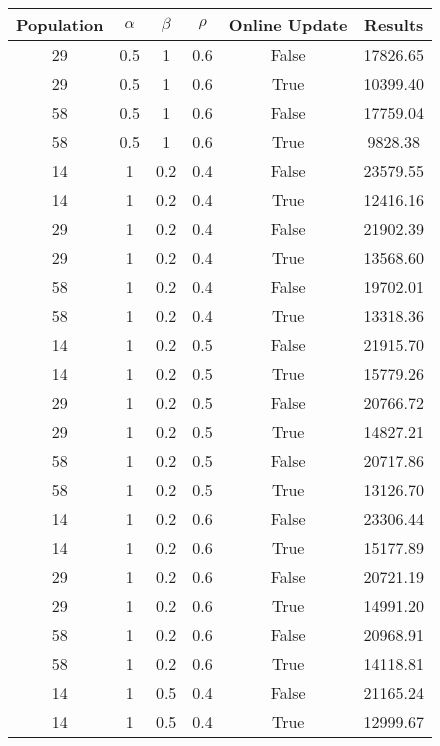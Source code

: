 \documentclass[12pt]{article}
\begin{document}
\begin{table}[h!]
\centering
\begin{tabular}{|c|c|c|c|c|c|}
\textbf{Population} & $\alpha$ & $\beta$ & $\rho$ & \textbf{Online Update} & \textbf{Results} \\ \hline
\hline
29  &  0.5  &  1  &  0.6  &  False  &  17826.65\\ \hline
29  &  0.5  &  1  &  0.6  &  True  &  10399.40\\ \hline
58  &  0.5  &  1  &  0.6  &  False  &  17759.04\\ \hline
58  &  0.5  &  1  &  0.6  &  True  &  9828.38\\ \hline
14  &  1  &  0.2  &  0.4  &  False  &  23579.55\\ \hline
14  &  1  &  0.2  &  0.4  &  True  &  12416.16\\ \hline
29  &  1  &  0.2  &  0.4  &  False  &  21902.39\\ \hline
29  &  1  &  0.2  &  0.4  &  True  &  13568.60\\ \hline
58  &  1  &  0.2  &  0.4  &  False  &  19702.01\\ \hline
58  &  1  &  0.2  &  0.4  &  True  &  13318.36\\ \hline
14  &  1  &  0.2  &  0.5  &  False  &  21915.70\\ \hline
14  &  1  &  0.2  &  0.5  &  True  &  15779.26\\ \hline
29  &  1  &  0.2  &  0.5  &  False  &  20766.72\\ \hline
29  &  1  &  0.2  &  0.5  &  True  &  14827.21\\ \hline
58  &  1  &  0.2  &  0.5  &  False  &  20717.86\\ \hline
58  &  1  &  0.2  &  0.5  &  True  &  13126.70\\ \hline
14  &  1  &  0.2  &  0.6  &  False  &  23306.44\\ \hline
14  &  1  &  0.2  &  0.6  &  True  &  15177.89\\ \hline
29  &  1  &  0.2  &  0.6  &  False  &  20721.19\\ \hline
29  &  1  &  0.2  &  0.6  &  True  &  14991.20\\ \hline
58  &  1  &  0.2  &  0.6  &  False  &  20968.91\\ \hline
58  &  1  &  0.2  &  0.6  &  True  &  14118.81\\ \hline
14  &  1  &  0.5  &  0.4  &  False  &  21165.24\\ \hline
14  &  1  &  0.5  &  0.4  &  True  &  12999.67\\ \hline

\end{tabular}
\end{table}
\end{document}
